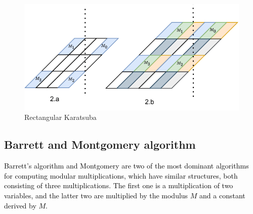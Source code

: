 \documentclass[conference]{IEEEtran}
\begin{document}
\begin{figure}[htbp]   %
	\centering
	\includegraphics[width=\linewidth,scale=1.00]{fig2.pdf}    %
	\caption{Rectangular Karatsuba}
	\label{Figure2}
\end{figure}


\subsection{Barrett and Montgomery algorithm}

\textcolor{black}{
Barrett's algorithm and Montgomery are two of the most dominant algorithms for computing modular multiplications, which have similar structures, both consisting of three multiplications. The first one is a multiplication of two variables, and the latter two are multiplied by the modulus $M$ and a constant derived by $M$. 
}
\end{document}
